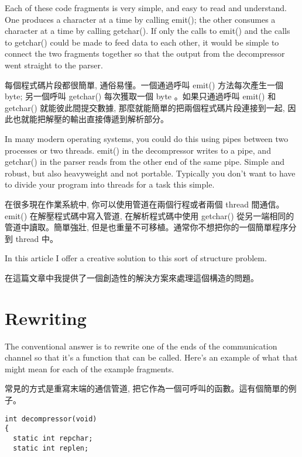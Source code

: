 \documentclass[12pt]{article}
\begin{document}
\begin{CJK}{UTF8}{bsmi}
\begin{multicols}{2}
\begin{lstlisting}[caption=parser, basicstyle=\footnotesize, breaklines=true, frame=single,frameround=tttt]
\end{lstlisting}
\end{multicols}

 Each of these code fragments is very simple, and easy to read and understand. One produces a character at a time by calling emit(); the other consumes a character at a time by calling getchar(). If only the calls to emit() and the calls to getchar() could be made to feed data to each other, it would be simple to connect the two fragments together so that the output from the decompressor went straight to the parser.

每個程式碼片段都很簡單, 通俗易懂。一個通過呼叫 emit() 方法每次產生一個 byte; 另一個呼叫 getchar() 每次獲取一個 byte 。如果只通過呼叫
emit() 和 getchar() 就能彼此間提交數據, 那麼就能簡單的把兩個程式碼片段連接到一起, 因此也就能把解壓的輸出直接傳遞到解析部分。

 In many modern operating systems, you could do this using pipes between two processes or two threads. emit() in the decompressor writes to a pipe, and getchar() in the parser reads from the other end of the same pipe. Simple and robust, but also heavyweight and not portable. Typically you don't want to have to divide your program into threads for a task this simple.

在很多現在作業系統中, 你可以使用管道在兩個行程或者兩個 thread 間通信。 emit() 在解壓程式碼中寫入管道, 在解析程式碼中使用
getchar() 從另一端相同的管道中讀取。簡單強壯, 但是也重量不可移植。通常你不想把你的一個簡單程序分到 thread 中。

In this article I offer a creative solution to this sort of structure problem. 

在這篇文章中我提供了一個創造性的解決方案來處理這個構造的問題。 

\section{Rewriting}
 The conventional answer is to rewrite one of the ends of the communication channel so that it's a function that can be called. Here's an example of what that might mean for each of the example fragments.

常見的方式是重寫末端的通信管道, 把它作為一個可呼叫的函數。這有個簡單的例子。 

\newpage
\begin{multicols}{2}

\begin{lstlisting}[caption=decompression, basicstyle=\footnotesize]
int decompressor(void) 
{
  static int repchar;
  static int replen;


\end{lstlisting}
\end{multicols}
\end{CJK}
\end{document}
